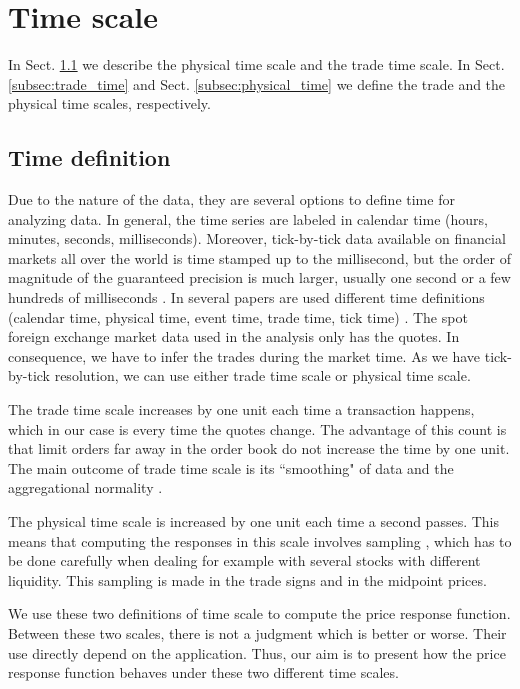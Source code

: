 \section{Time scale}\label{sec:time_scale}

In Sect. \ref{subsec:time_definition} we describe the physical time scale and
the trade time scale. In Sect. \ref{subsec:trade_time} and Sect.
\ref{subsec:physical_time} we define the trade and the physical time scales,
respectively.

\subsection{Time definition}\label{subsec:time_definition}

Due to the nature of the data, they are several options to define time for
analyzing data. In general, the time series are labeled in calendar time
(hours, minutes, seconds, milliseconds). Moreover, tick-by-tick data available
on financial markets all over the world is time stamped up to the millisecond,
but the order of magnitude of the guaranteed precision is much larger, usually
one second or a few hundreds of milliseconds
\cite{market_digest,empirical_facts}. In several papers are used different time
definitions (calendar time, physical time, event time, trade time, tick time)
\cite{empirical_facts,sampling_returns,market_making}. The spot foreign
exchange market data used in the analysis only has the quotes. In consequence,
we have to infer the trades during the market time. As we have tick-by-tick
resolution, we can use either trade time scale or physical time scale.

The trade time scale increases by one unit each time a transaction happens,
which in our case is every time the quotes change. The advantage of this count
is that limit orders far away in the order book do not increase the time by one
unit. The main outcome of trade time scale is its ``smoothing" of data and the
aggregational normality \cite{empirical_facts}.

The physical time scale is increased by one unit each time a second passes.
This means that computing the responses in this scale involves sampling
\cite{Wang_2016_cross,sampling_returns}, which has to be done carefully when
dealing for example with several stocks with different liquidity. This sampling
is made in the trade signs and in the midpoint prices.

We use these two definitions of time scale to compute the price response
function. Between these two scales, there is not a judgment which is better or
worse. Their use directly depend on the application. Thus, our aim is to
present how the price response function behaves under these two different time
scales.

